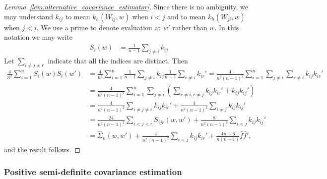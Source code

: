 \begin{proof}[Lemma~\ref{lem:alternative_covariance_estimator}]

  Since there is no ambiguity,
  we may understand
  $k_{i j}$
  to mean $k_h(W_{i j},w)$
  when $i<j$
  and
  to mean $k_h(W_{j i},w)$
  when $j<i$.
  We use a prime
  to denote evaluation at $w'$
  rather than $w$.
  In this notation we may write
  \begin{align*}
    S_i(w)
    &=
    \frac{1}{n-1}
    \sum_{j \neq i}
    k_{i j}
  \end{align*}
  Let $\sum_{i \neq j \neq r}$
  indicate that all the indices are distinct.
  Then
  \begin{align*}
    \frac{4}{n^2}
    \sum_{i=1}^n
    S_i(w) S_i(w')
    &=
    \frac{4}{n^2}
    \sum_{i=1}^n
    \frac{1}{n-1}
    \sum_{j \neq i}
    k_{i j}
    \frac{1}{n-1}
    \sum_{r \neq i}
    k_{i r}'
    =
    \frac{4}{n^2(n-1)^2}
    \sum_{i=1}^n
    \sum_{j \neq i}
    \sum_{r \neq i}
    k_{i j}
    k_{i r}' \\
    &=
    \frac{4}{n^2(n-1)^2}
    \sum_{i=1}^n
    \sum_{j \neq i}
    \left(
      \sum_{r \neq i, r \neq j}
      k_{i j}
      k_{i r}'
      + k_{i j}
      k_{i j}'
    \right) \\
    &=
    \frac{4}{n^2(n-1)^2}
    \sum_{i \neq j \neq r}
    k_{i j}
    k_{i r}'
    + \frac{4}{n^2(n-1)^2}
    \sum_{i \neq j}
    k_{i j}
    k_{i j}' \\
    &=
    \frac{24}{n^2(n-1)^2}
    \sum_{i < j < r}
    S_{i j r}(w,w')
    + \frac{8}{n^2(n-1)^2}
    \sum_{i < j}
    k_{i j}
    k_{i j}' \\
    &=
    \hat \Sigma_n(w,w')
    + \frac{4}{n^2(n-1)^2}
    \sum_{i < j}
    k_{i j}
    k_{i r}'
    + \frac{4n-6}{n(n-1)}
    \hat f
    \hat f',
  \end{align*}
  and the result follows.
\end{proof}

\subsubsection{Positive semi-definite covariance estimation}

